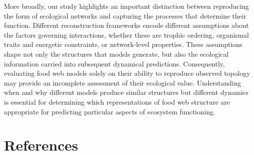 \documentclass[
]{article}
\begin{document}
More broadly, our study highlights an important distinction between
reproducing the form of ecological networks and capturing the processes
that determine their function. Different reconstruction frameworks
encode different assumptions about the factors governing interactions,
whether these are trophic ordering, organismal traits and energetic
constraints, or network-level properties. These assumptions shape not
only the structures that models generate, but also the ecological
information carried into subsequent dynamical predictions. Consequently,
evaluating food web models solely on their ability to reproduce observed
topology may provide an incomplete assessment of their ecological value.
Understanding when and why different models produce similar structures
but different dynamics is essential for determining which
representations of food web structure are appropriate for predicting
particular aspects of ecosystem functioning.

\section*{References}\label{references}
\end{document}
